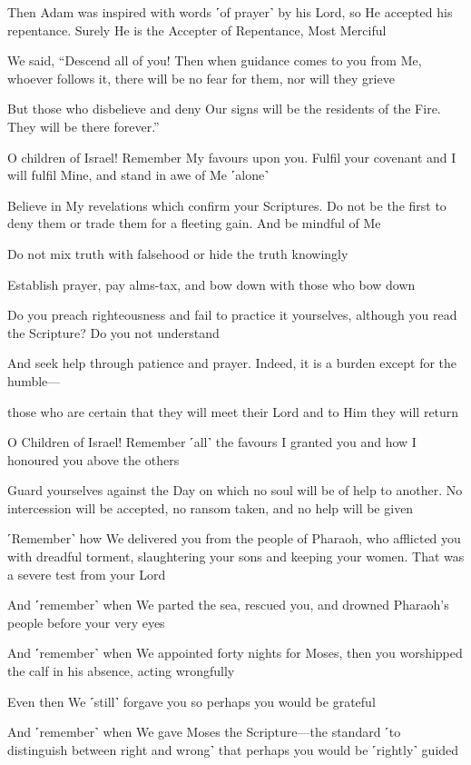 Then Adam was inspired with words ˹of prayer˺ by his Lord, so He accepted his repentance. Surely He is the Accepter of Repentance, Most Merciful

We said, “Descend all of you! Then when guidance comes to you from Me, whoever follows it, there will be no fear for them, nor will they grieve

But those who disbelieve and deny Our signs will be the residents of the Fire. They will be there forever.”

O children of Israel! Remember My favours upon you. Fulfil your covenant and I will fulfil Mine, and stand in awe of Me ˹alone˺

Believe in My revelations which confirm your Scriptures. Do not be the first to deny them or trade them for a fleeting gain. And be mindful of Me

Do not mix truth with falsehood or hide the truth knowingly

Establish prayer, pay alms-tax, and bow down with those who bow down

Do you preach righteousness and fail to practice it yourselves, although you read the Scripture? Do you not understand

And seek help through patience and prayer. Indeed, it is a burden except for the humble—

those who are certain that they will meet their Lord and to Him they will return

O Children of Israel! Remember ˹all˺ the favours I granted you and how I honoured you above the others

Guard yourselves against the Day on which no soul will be of help to another. No intercession will be accepted, no ransom taken, and no help will be given

˹Remember˺ how We delivered you from the people of Pharaoh, who afflicted you with dreadful torment, slaughtering your sons and keeping your women. That was a severe test from your Lord

And ˹remember˺ when We parted the sea, rescued you, and drowned Pharaoh’s people before your very eyes

And ˹remember˺ when We appointed forty nights for Moses, then you worshipped the calf in his absence, acting wrongfully

Even then We ˹still˺ forgave you so perhaps you would be grateful

And ˹remember˺ when We gave Moses the Scripture—the standard ˹to distinguish between right and wrong˺ that perhaps you would be ˹rightly˺ guided

